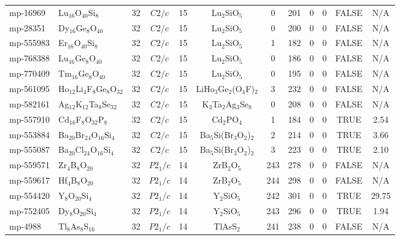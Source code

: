 {\begin{longtable}{llcccccccccc}
    mp-16969 & Lu$_{16}$O$_{40}$Si$_{8}$ & 32    & $C2/c$ & 15    & Lu$_{2}$SiO$_{5}$ & 0     & 201   & 0     & 0     & FALSE & N/A \\
    mp-28351 & Dy$_{16}$Ge$_{8}$O$_{40}$ & 32    & $C2/c$ & 15    & Lu$_{2}$SiO$_{5}$ & 0     & 200   & 0     & 0     & FALSE & N/A \\
    mp-555983 & Er$_{16}$O$_{40}$Si$_{8}$ & 32    & $C2/c$ & 15    & Lu$_{2}$SiO$_{5}$ & 1     & 182   & 0     & 0     & FALSE & N/A \\
    mp-768388 & Lu$_{16}$Ge$_{8}$O$_{40}$ & 32    & $C2/c$ & 15    & Lu$_{2}$SiO$_{5}$ & 0     & 186   & 0     & 0     & FALSE & N/A \\
    mp-770409 & Tm$_{16}$Ge$_{8}$O$_{40}$ & 32    & $C2/c$ & 15    & Lu$_{2}$SiO$_{5}$ & 0     & 195   & 0     & 0     & FALSE & N/A \\
    mp-561095 & Ho$_{12}$Li$_{4}$F$_{8}$Ge$_{8}$O$_{32}$ & 32    & $C2/c$ & 15    & LiHo$_{3}$Ge$_{2}$(O$_{4}$F)$_{2}$ & 3     & 232   & 0     & 0     & FALSE & N/A \\
    mp-582161 & Ag$_{12}$K$_{12}$Ta$_{8}$Se$_{32}$ & 32    & $C2/c$ & 15    & K$_{3}$Ta$_{2}$Ag$_{3}$Se$_{8}$ & 0     & 208   & 0     & 0     & FALSE & N/A \\
    mp-557910 & Cd$_{16}$F$_{8}$O$_{32}$P$_{8}$ & 32    & $C2/c$ & 15    & Cd$_{2}$PO$_{4}$ & 1     & 184   & 0     & 0     & TRUE  & 2.54  \\
    mp-553884 & Ba$_{20}$Br$_{24}$O$_{16}$Si$_{4}$ & 32    & $C2/c$ & 15    & Ba$_{5}$Si(Br$_{3}$O$_{2}$)$_{2}$ & 2     & 214   & 0     & 0     & TRUE  & 3.66  \\
    mp-555087 & Ba$_{20}$Cl$_{24}$O$_{16}$Si$_{4}$ & 32    & $C2/c$ & 15    & Ba$_{5}$Si(Br$_{3}$O$_{2}$)$_{2}$ & 3     & 223   & 0     & 0     & TRUE  & 2.10  \\
    mp-559571 & Zr$_{4}$B$_{8}$O$_{20}$ & 32    & $P2_1/c$ & 14    & ZrB$_{2}$O$_{5}$ & 243   & 278   & 0     & 0     & FALSE & N/A \\
    mp-559617 & Hf$_{4}$B$_{8}$O$_{20}$ & 32    & $P2_1/c$ & 14    & ZrB$_{2}$O$_{5}$ & 244   & 298   & 0     & 0     & FALSE & N/A \\
    mp-554420 & Y$_{8}$O$_{20}$Si$_{4}$ & 32    & $P2_1/c$ & 14    & Y$_{2}$SiO$_{5}$ & 242   & 301   & 0     & 0     & TRUE  & 29.75  \\
    mp-752405 & Dy$_{8}$O$_{20}$Si$_{4}$ & 32    & $P2_1/c$ & 14    & Y$_{2}$SiO$_{5}$ & 243   & 296   & 0     & 0     & TRUE  & 1.94  \\
    mp-4988 & Tl$_{8}$As$_{8}$S$_{16}$ & 32    & $P2_1/c$ & 14    & TlAsS$_{2}$ & 241   & 238   & 0     & 0     & FALSE & N/A \\

\end{longtable}}
